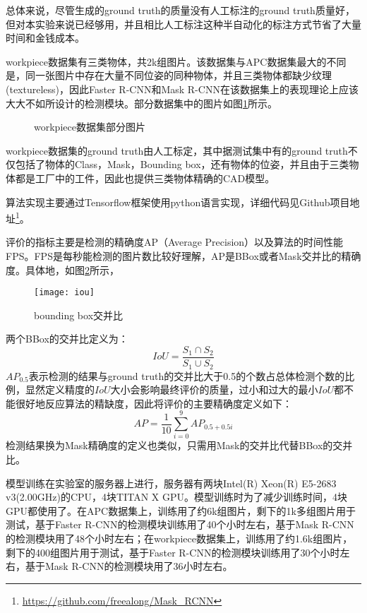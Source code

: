 总体来说，尽管生成的ground truth的质量没有人工标注的ground truth质量好，但对本实验来说已经够用，并且相比人工标注这种半自动化的标注方式节省了大量时间和金钱成本。

workpiece数据集有三类物体，共2k组图片。该数据集与APC数据集最大的不同是，同一张图片中存在大量不同位姿的同种物体，并且三类物体都缺少纹理(textureless)，因此Faster R-CNN和Mask R-CNN在该数据集上的表现理论上应该大大不如所设计的检测模块。部分数据集中的图片如图\ref{fig:wp_dataset}所示。
\begin{figure}[ht]
  \centering
  \hskip0.2cm
  \hskip0.2cm
  \vfill
  \hskip0.2cm
  \hskip0.2cm
  \caption{workpiece数据集部分图片}
  \label{fig:wp_dataset}
\end{figure}
workpiece数据集的ground truth由人工标定，其中据测试集中有的ground truth不仅包括了物体的Class，Mask，Bounding box，还有物体的位姿，并且由于三类物体都是工厂中的工件，因此也提供三类物体精确的CAD模型。

{\kai 算法实现}主要通过Tensorflow框架使用python语言实现，详细代码见Github项目地址\footnote{\url{https://github.com/freealong/Mask\_RCNN}}。

{\kai 评价的指标}主要是检测的精确度AP（Average Precision）以及算法的时间性能FPS。FPS是每秒能检测的图片数比较好理解，AP是BBox或者Mask交并比的精确度。具体地，如图\ref{fig:iou}所示，
\begin{figure}[ht]
  \centering
  \texttt{[image: iou]}
  \caption{bounding box交并比}
  \label{fig:iou}
\end{figure}
两个BBox的交并比定义为：
\begin{equation}
  IoU = \frac{S_1\cap S_2}{S_1\cup S_2}
\end{equation}
$AP_{0.5}$表示检测的结果与ground truth的交并比大于0.5的个数占总体检测个数的比例，显然定义精度的$IoU$大小会影响最终评价的质量，过小和过大的最小$IoU$都不能很好地反应算法的精缺度，因此将评价的主要精确度定义如下：
\begin{equation}
  AP = \frac{1}{10}\sum_{i=0}^{9}{AP_{0.5 + 0.5i}}
\end{equation}
检测结果换为Mask精确度的定义也类似，只需用Mask的交并比代替BBox的交并比。

{\kai 模型训练}在实验室的服务器上进行，服务器有两块Intel(R) Xeon(R) E5-2683 v3(2.00GHz)的CPU，4块TITAN X GPU。模型训练时为了减少训练时间，4块GPU都使用了。在APC数据集上，训练用了约6k组图片，剩下的1k多组图片用于测试，基于Faster R-CNN的检测模块训练用了40个小时左右，基于Mask R-CNN的检测模块用了48个小时左右；在workpiece数据集上，训练用了约1.6k组图片，剩下的400组图片用于测试，基于Faster R-CNN的检测模块训练用了30个小时左右，基于Mask R-CNN的检测模块用了36小时左右。

